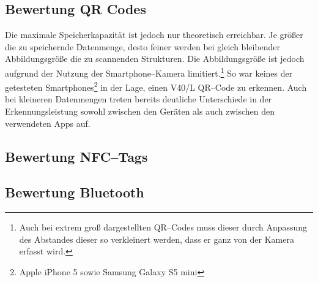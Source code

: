 \subsection{Bewertung QR Codes} %
\label{sub:bewertung_qr_codes}
Die maximale Speicherkapazität ist jedoch nur theoretisch erreichbar. Je größer die zu speichernde Datenmenge, desto feiner werden bei gleich bleibender Abbildungsgröße die zu scannenden Strukturen. Die Abbildungsgröße ist jedoch aufgrund der Nutzung der Smartphone–Kamera limitiert.\footnote{Auch bei extrem groß dargestellten QR–Codes muss dieser durch Anpassung des Abstandes dieser so verkleinert werden, dass er ganz von der Kamera erfasst wird.} So war keines der getesteten Smartphones\footnote{Apple iPhone 5 sowie Samsung Galaxy S5 mini} in der Lage, einen V40/L QR–Code zu erkennen. Auch bei kleineren Datenmengen treten bereits deutliche Unterschiede in der Erkennungsleistung sowohl zwischen den Geräten als auch zwischen den verwendeten Apps auf.



\subsection{Bewertung NFC–Tags} %
\label{sub:bewertung_nfc_tags}



\subsection{Bewertung Bluetooth} %
\label{sub:bewertung_bluetooth}

